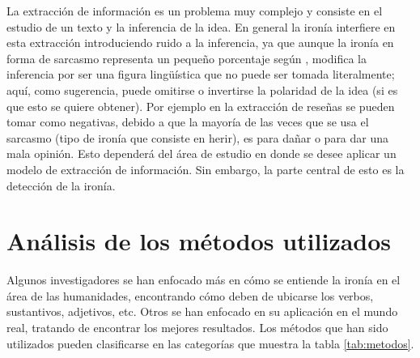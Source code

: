 \par La extracción de información es un problema muy complejo y consiste en el estudio de un texto y la inferencia de la idea. En general la ironía interfiere en esta extracción introduciendo ruido a la inferencia, ya que aunque la ironía en forma de sarcasmo representa un pequeño porcentaje según \textcite{liu2007low}, modifica la inferencia por ser una figura lingüística que no puede ser tomada literalmente; aquí, como sugerencia, puede omitirse o invertirse la polaridad de la idea (si es que esto se quiere obtener). Por ejemplo en la extracción de reseñas se pueden tomar como negativas, debido a que la mayoría de las veces que se usa el sarcasmo (tipo de ironía que consiste en herir), es para dañar o para dar una mala opinión. Esto dependerá del área de estudio en donde se desee aplicar un modelo de extracción de información. Sin embargo, la parte central de esto es la detección de la ironía.

\section{Análisis de los métodos utilizados}
\par Algunos investigadores se han enfocado más en cómo se entiende la ironía en el área de las humanidades, encontrando cómo deben de ubicarse los verbos, sustantivos, adjetivos, etc. Otros se han enfocado en su aplicación en el mundo real, tratando de encontrar los mejores resultados. Los métodos que han sido utilizados pueden clasificarse en las categorías que muestra la tabla \ref{tab:metodos}.

